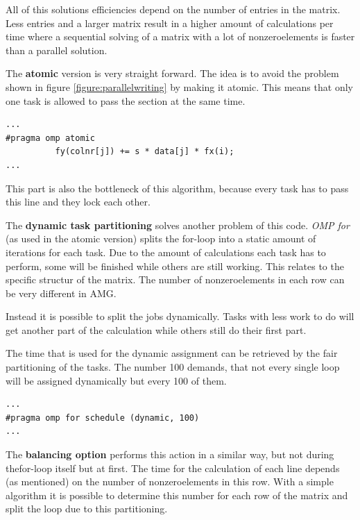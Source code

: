 \documentclass[a4paper,11pt]{scrartcl}
\begin{document}
All of this solutions efficiencies depend on the number of entries in the matrix.
Less entries and a larger matrix result in a higher amount of calculations per
 time where a sequential solving of a matrix with a lot of nonzeroelements is
 faster than a parallel solution.

The \textbf{atomic} version is very straight forward. The idea is to avoid the problem
 shown in figure \ref{figure:parallelwriting} by making it atomic. This means
 that only one task is allowed to pass the section at the same time.

\begin{lstlisting}
...
#pragma omp atomic
          fy(colnr[j]) += s * data[j] * fx(i);
...
\end{lstlisting}

This part is also the bottleneck of this algorithm, because every task has to pass this
line and they lock each other.

The \textbf{dynamic task partitioning} solves another problem of this code. {\em OMP for}
(as used in the atomic version)
 splits the for-loop into a  static amount of iterations for each task. Due to the amount
 of calculations each task has to perform, some will be finished while others
are still working. This relates to the specific structur of the matrix. The
 number of nonzeroelements in each row can be very different in AMG.

Instead it is possible to split the jobs dynamically. Tasks with less work to do will
get another part of the calculation while others still do their first part.

The time that is used for the dynamic assignment can be retrieved by the fair
partitioning of the tasks. The number 100 demands, that not every single loop
 will be assigned dynamically but every 100 of them.

\begin{lstlisting}
...
#pragma omp for schedule (dynamic, 100)
...
\end{lstlisting}

The \textbf{balancing option} performs this action in a similar way, but not 
during thefor-loop itself but at first. The time for the calculation of each line
depends (as mentioned) on the number of nonzeroelements in this row. With a
simple algorithm it is possible to  determine this number for each row of the
 matrix and split the loop due to this partitioning.
\end{document}

